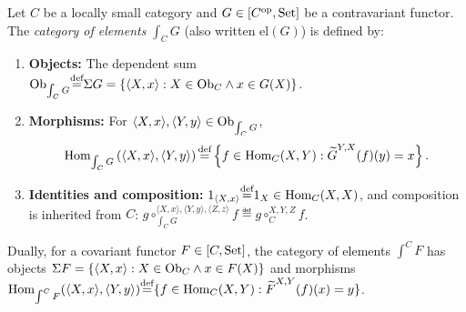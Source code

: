 \documentclass[10pt,a4paper]{article}
\begin{document}
\begin{definition}\label{def:cat_of_elements}
Let $C$ be a locally small category and $G \in [C^{\textrm{op}}, {\textrm{Set}}]$ be a contravariant functor. The \emph{category of elements} $\int_C G$ (also written $\mathrm{el}(G)$) is defined by:
\begin{enumerate}
\item \textbf{Objects:} The dependent sum ${\textrm{Ob}}_{\int_C G} {\stackrel{{\textrm{def}}}{=}} \Sigma G = \{\langle X, x \rangle : X \in {\textrm{Ob}}_C \land x \in G(X)\}$.
\item \textbf{Morphisms:} For $\langle X, x \rangle, \langle Y, y \rangle \in {\textrm{Ob}}_{\int_C G}$,
$${\textrm{Hom}}_{\int_C G}\left(\langle X, x \rangle, \langle Y, y \rangle\right) {\stackrel{{\textrm{def}}}{=}} \left\{ f \in {\textrm{Hom}}_C(X, Y) : {\widetilde{G}\textrm{}}^{Y,X}(f)(y) = x \right\}.$$
\item \textbf{Identities and composition:} $1_{\langle X, x \rangle} {\stackrel{{\textrm{def}}}{=}} 1_X \in {\textrm{Hom}}_C(X,X)$, and composition is inherited from $C$: $g \circ_{\int_C G}^{\langle X,x\rangle,\langle Y,y\rangle,\langle Z,z\rangle} f \eqdef g \circ_C^{X,Y,Z} f$.
\end{enumerate}
Dually, for a covariant functor $F \in [C, {\textrm{Set}}]$, the category of elements $\int^C F$ has objects $\Sigma F = \{\langle X, x \rangle : X \in {\textrm{Ob}}_C \land x \in F(X)\}$ and morphisms ${\textrm{Hom}}_{\int^C F}(\langle X, x \rangle, \langle Y, y \rangle) {\stackrel{{\textrm{def}}}{=}} \{f \in {\textrm{Hom}}_C(X, Y) : {\widetilde{F}\textrm{}}^{X,Y}(f)(x) = y\}$.
\end{definition}
\end{document}
